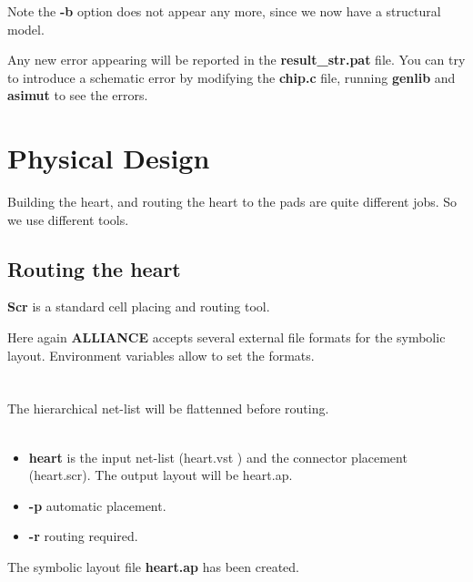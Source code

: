 \documentclass[11pt,a4]{article}
\begin{document}
Note the {\bf -b} option does not appear any more, since we now have a 
structural model.

Any new error appearing will be reported in the {\bf result\_str.pat} file.
You can try to introduce a schematic error by modifying the {\bf chip.c} file,
running {\bf genlib} and {\bf asimut} to see the errors.
\section{Physical Design}

Building the heart, and routing the heart to the pads are quite different jobs.
So we use different tools.

\subsection{Routing the heart}

{\bf Scr} is a standard cell placing and routing tool.

Here again {\bf ALLIANCE} accepts several external file formats
for the symbolic layout.
Environment variables allow to set the formats.\\
\\
\fbox{
\shortstack[l]{
{\bf $>$ MBK\_IN\_PH=ap}\\
{\bf $>$ MBK\_OUT\_PH=ap}\\
{\bf [ $>$ export  MBK\_IN\_PH MBK\_OUT\_PH }
}
}
\\
The hierarchical net-list will be flattenned before routing.\\
\\
\begin{itemize}
\item {\bf heart}     is the input net-list (heart.vst ) and  the connector placement (heart.scr). The output layout will be heart.ap.
\item {\bf -p}        automatic placement.
\item {\bf -r}        routing required.

\end{itemize}
The symbolic layout file {\bf heart.ap} has been created.
\end{document}
